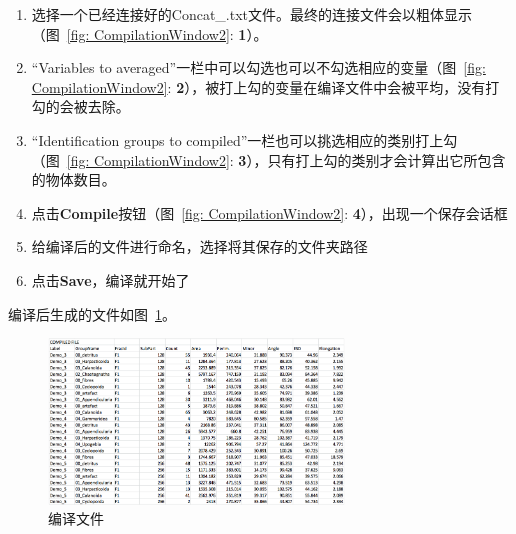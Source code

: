\documentclass[12pt]{article}
\begin{document}
\begin{enumerate}
\item 选择一个已经连接好的Concat\_.txt文件。最终的连接文件会以粗体显示（图~\ref{fig: CompilationWindow2}: {\color{red}\textbf{1}}）。
\item “Variables to averaged”一栏中可以勾选也可以不勾选相应的变量（图~\ref{fig: CompilationWindow2}: {\color{red}\textbf{2}}），被打上勾的变量在编译文件中会被平均，没有打勾的会被去除。
\item “Identification groups to compiled”一栏也可以挑选相应的类别打上勾（图~\ref{fig: CompilationWindow2}: {\color{red}\textbf{3}}），只有打上勾的类别才会计算出它所包含的物体数目。
\item 点击\textbf{Compile}按钮（图~\ref{fig: CompilationWindow2}: {\color{red}\textbf{4}}），出现一个保存会话框
\item 给编译后的文件进行命名，选择将其保存的文件夹路径
\item 点击\textbf{Save}，编译就开始了
\end{enumerate}

编译后生成的文件如图~\ref{fig: CompilationFile}。

\begin{figure}[!ht]
\centering
\includegraphics[width=0.7\textwidth]{CompilationFile}
\caption{编译文件}
\label{fig: CompilationFile}
\end{figure}

\end{document}

